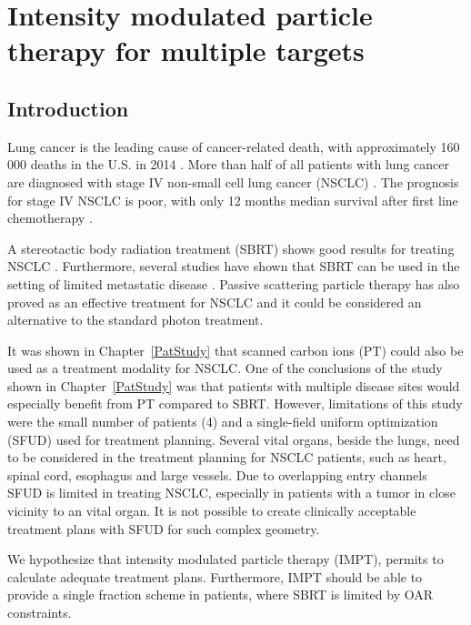 \chapter{Intensity modulated particle therapy for multiple targets}
\label{chapter:complex}
\minitoc

\section{Introduction}

Lung cancer is the leading cause of cancer-related death, with approximately 160 000 deaths in the U.S. in 2014 \cite{Siegel2014}.
More than half of all patients with lung cancer are diagnosed with stage IV non-small cell lung cancer (NSCLC) \cite{Ramalingam2008, Iyengar2014}.
The prognosis for stage IV NSCLC is poor, with only 12 months median survival after first line chemotherapy \cite{Socinski2013}. 

A stereotactic body radiation treatment (SBRT) shows good results for treating NSCLC \cite{Baumann2009, Fakiris2009, Grutters2010, Greco2011}. 
Furthermore, several studies have shown that SBRT can be used in the setting of limited metastatic 
disease \cite{Rusthoven2009, Villaruz2012, Salama2012, Iyengar2014}. 
Passive scattering particle therapy has also proved as an effective treatment for NSCLC \cite{Grutters2010, Tsujii2012} and it could be considered an alternative
to the standard photon treatment.

It was shown in Chapter~\ref{PatStudy} that scanned carbon ions (PT) could also be used as a treatment modality for NSCLC. One of the conclusions of the study shown in Chapter~\ref{PatStudy} 
was that patients with multiple disease sites would especially benefit from PT compared to SBRT. However, limitations of this study were the small number of patients (4) and
a single-field uniform optimization (SFUD) used for treatment planning. Several vital organs, beside the lungs, need to be considered in the treatment planning for NSCLC patients, such as heart, spinal cord, esophagus and large vessels.
Due to overlapping entry channels SFUD is limited in treating NSCLC, especially in patients with a tumor in close vicinity to an vital organ.
It is not possible to create clinically acceptable treatment plans with SFUD for such complex geometry.

We hypothesize that intensity modulated particle therapy (IMPT), permits to calculate adequate treatment plans. Furthermore, IMPT 
should be able to provide a single fraction scheme in patients, where SBRT is limited by OAR constraints. 

